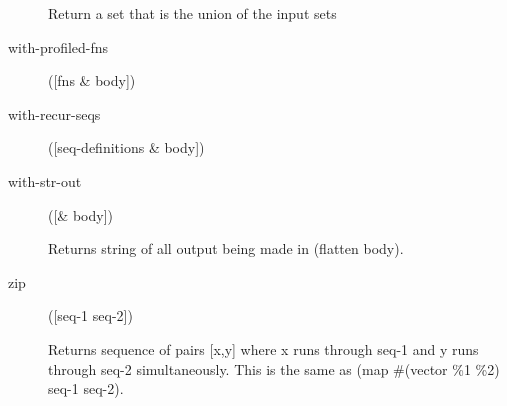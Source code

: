 \begin{description}
Return a set that is the union of the input sets

  \item[with-profiled-fns]
([fns \& body])



  \item[with-recur-seqs]
([seq-definitions \& body])



  \item[with-str-out]
([\& body])

Returns string of all output being made in (flatten body).

  \item[zip]
([seq-1 seq-2])

Returns sequence of pairs [x,y] where x runs through seq-1 and
  y runs through seq-2 simultaneously. This is the same as
  (map \#(vector \%1 \%2) seq-1 seq-2).

\end{description}

